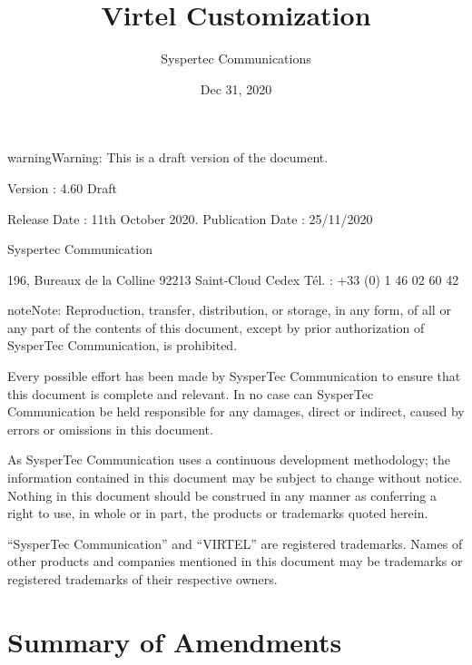 \documentclass[letterpaper,10pt,english]{sphinxmanual}
\title{Virtel Customization}
\date{Dec 31, 2020}
\author{Syspertec Communications}
\begin{document}
\pagestyle{empty}
\sphinxmaketitle
\pagestyle{plain}
\sphinxtableofcontents
\pagestyle{normal}
\label{\detokenize{Customization::doc}}




\begin{sphinxadmonition}{warning}{Warning:}
This is a draft version of the document.
\end{sphinxadmonition}

Version : 4.60 Draft

Release Date : 11th October 2020. Publication Date : 25/11/2020

Syspertec Communication

196, Bureaux de la Colline 92213 Saint-Cloud Cedex Tél. : +33 (0) 1 46 02 60 42


\begin{sphinxadmonition}{note}{Note:}
Reproduction, transfer, distribution, or storage, in any form, of all or any part of
the contents of this document, except by prior authorization of SysperTec
Communication, is prohibited.

Every possible effort has been made by SysperTec Communication to ensure that this document
is complete and relevant. In no case can SysperTec Communication be held responsible for
any damages, direct or indirect, caused by errors or omissions in this document.

As SysperTec Communication uses a continuous development methodology; the information
contained in this document may be subject to change without notice. Nothing in this
document should be construed in any manner as conferring a right to use, in whole or in
part, the products or trademarks quoted herein.

“SysperTec Communication” and “VIRTEL” are registered trademarks. Names of other products
and companies mentioned in this document may be trademarks or registered trademarks of
their respective owners.
\end{sphinxadmonition}

\newpage


\chapter{Summary of Amendments}
\label{\detokenize{Customization:summary-of-amendments}}\label{\detokenize{Customization:virtel460hw-summary-of-amendments}}
\end{document}
